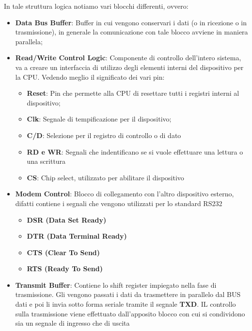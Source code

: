 In tale struttura logica notiamo vari blocchi differenti, ovvero:
\begin{itemize}
    \item \textbf{Data Bus Buffer}: Buffer in cui vengono conservari i dati (o in ricezione o in trasmissione), in generale la comunicazione con tale blocco avviene in maniera parallela;
    \item \textbf{Read/Write Control Logic}: Componente di controllo dell'intero sistema, va a creare un interfaccia di utilizzo degli elementi interni del dispositivo per la CPU. Vedendo meglio il significato dei vari pin:
    \begin{itemize}
        \item \textbf{Reset}: Pin che permette alla CPU di resettare tutti i registri interni al dispositivo;
        \item \textbf{Clk}: Segnale di tempificazione per il dispositivo;
        \item \textbf{C/D}: Selezione per il registro di controllo o di dato
        \item \textbf{RD e WR}: Segnali che indentificano se si vuole effettuare una lettura o una scrittura
        \item \textbf{CS}: Chip select, utilizzato per abilitare il dispositivo
    \end{itemize} 

    \item \textbf{Modem Control}: Blocco di collegamento con l'altro dispositivo esterno, difatti contiene i segnali che vengono utilizzati per lo standard RS232
    \begin{itemize}
        \item \textbf{DSR (Data Set Ready)}
        \item \textbf{DTR (Data Terminal Ready)}
        \item \textbf{CTS (Clear To Send)}
        \item \textbf{RTS (Ready To Send)}
    \end{itemize}

    \item \textbf{Transmit Buffer}: Contiene lo shift register impiegato nella fase di trasmissione. Gli vengono passati i dati da trasmettere in parallelo dal BUS dati e poi li invia sotto forma seriale tramite il segnale \textbf{TXD}. IL controllo sulla trasmissione viene effettuato dall'apposito blocco con cui si condividono sia un segnale di ingresso che di uscita
    

\end{itemize}
